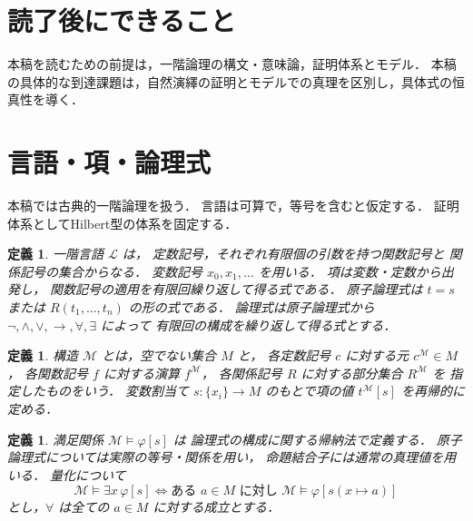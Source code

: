 \documentclass[a5paper,10pt,onecolumn]{jsarticle}
\theoremstyle{mathnotetheorem}
\newtheorem{definition}[theorem]{定義}
\begin{document}
\section*{読了後にできること}
本稿を読むための前提は，一階論理の構文・意味論，証明体系とモデル．
本稿の具体的な到達課題は，自然演繹の証明とモデルでの真理を区別し，具体式の恒真性を導く．

\section{言語・項・論理式}

本稿では古典的一階論理を扱う．
言語は可算で，等号を含むと仮定する．
証明体系としてHilbert型の体系を固定する．

\begin{definition}
\emph{一階言語} $\mathcal L$ は，
定数記号，それぞれ有限個の引数を持つ関数記号と
関係記号の集合からなる．
変数記号 $x_0,x_1,\dots$ を用いる．
\emph{項}は変数・定数から出発し，
関数記号の適用を有限回繰り返して得る式である．
\emph{原子論理式}は $t=s$ または
$R(t_1,\dots,t_n)$ の形の式である．
論理式は原子論理式から
$\neg,\land,\lor,\to,\forall,\exists$ によって
有限回の構成を繰り返して得る式とする．
\end{definition}

\begin{definition}
構造 $\mathcal M$ とは，空でない集合 $M$ と，
各定数記号 $c$ に対する元 $c^{\mathcal M}\in M$，
各関数記号 $f$ に対する演算 $f^{\mathcal M}$，
各関係記号 $R$ に対する部分集合 $R^{\mathcal M}$ を
指定したものをいう．
変数割当て $s:\{x_i\}\to M$ のもとで項の値
$t^{\mathcal M}[s]$ を再帰的に定める．
\end{definition}

\begin{definition}
満足関係 $\mathcal M\models\varphi[s]$ は
論理式の構成に関する帰納法で定義する．
原子論理式については実際の等号・関係を用い，
命題結合子には通常の真理値を用いる．
量化について
\[
 \mathcal M\models\exists x\,\varphi[s]
 \iff
 \text{ある }a\in M\text{ に対し }
 \mathcal M\models\varphi[s(x\mapsto a)]
\]
とし，$\forall$ は全ての $a\in M$ に対する成立とする．
\end{definition}
\end{document}
